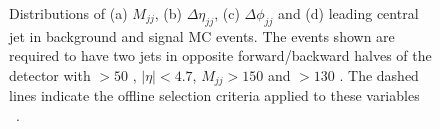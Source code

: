 \begin{figure}
  \caption{Distributions of (a) $M_{jj}$, (b) $\Delta\eta_{jj}$, (c) $\Delta\phi_{jj}$ and (d) leading central jet \pt in background and signal \ac{MC} events. The events shown are required to have two jets in opposite forward/backward halves of the detector with \pt$>50$ \GeV, $|\eta|<4.7$, $M_{jj}>150$ \GeV and \MET$>130$ \GeV. The dashed lines indicate the offline selection criteria applied to these variables ~\cite{Chatrchyan:2014tja}.}
  \label{fig:promptcontrolplots}
\end{figure}



